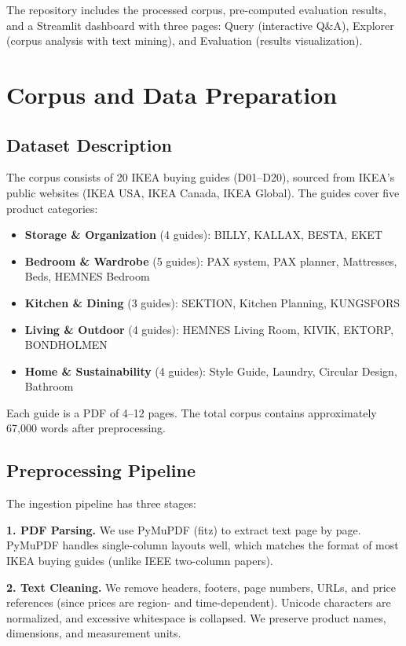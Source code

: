 \documentclass[conference]{IEEEtran}
\begin{document}
The repository includes the processed corpus, pre-computed evaluation results, and a Streamlit dashboard with three pages: Query (interactive Q\&A), Explorer (corpus analysis with text mining), and Evaluation (results visualization).

\section{Corpus and Data Preparation}

\subsection{Dataset Description}

The corpus consists of 20 IKEA buying guides (D01--D20), sourced from IKEA's public websites (IKEA USA, IKEA Canada, IKEA Global). The guides cover five product categories:

\begin{itemize}
    \item \textbf{Storage \& Organization} (4 guides): BILLY, KALLAX, BESTA, EKET
    \item \textbf{Bedroom \& Wardrobe} (5 guides): PAX system, PAX planner, Mattresses, Beds, HEMNES Bedroom
    \item \textbf{Kitchen \& Dining} (3 guides): SEKTION, Kitchen Planning, KUNGSFORS
    \item \textbf{Living \& Outdoor} (4 guides): HEMNES Living Room, KIVIK, EKTORP, BONDHOLMEN
    \item \textbf{Home \& Sustainability} (4 guides): Style Guide, Laundry, Circular Design, Bathroom
\end{itemize}

Each guide is a PDF of 4--12 pages. The total corpus contains approximately 67,000 words after preprocessing.

\subsection{Preprocessing Pipeline}

The ingestion pipeline has three stages:

\textbf{1. PDF Parsing.} We use PyMuPDF (fitz) to extract text page by page. PyMuPDF handles single-column layouts well, which matches the format of most IKEA buying guides (unlike IEEE two-column papers).

\textbf{2. Text Cleaning.} We remove headers, footers, page numbers, URLs, and price references (since prices are region- and time-dependent). Unicode characters are normalized, and excessive whitespace is collapsed. We preserve product names, dimensions, and measurement units.
\end{document}
